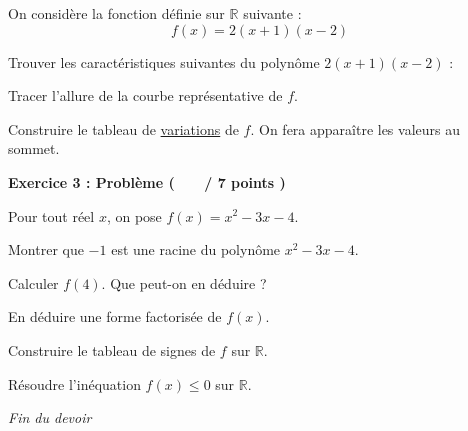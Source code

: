 \documentclass[12pt,a4paper]{exam}
\begin{document}
\vspace{5pt}
\noindent
On considère la fonction définie sur $\mathbb{R}$ suivante :
\[
f(x) = 2(x+1)(x-2)
\]

\begin{questions}

\question Trouver les caractéristiques suivantes du polynôme 
$2(x+1)(x-2)$ :

\question[1] Tracer l'allure de la courbe représentative de $f$.


\question[2] Construire le tableau de \underline{variations} de $f$. On fera 
apparaître les valeurs au sommet.

\end{questions}

\vspace{0.5cm}

\noindent
\textbf{Exercice 3 : Problème ( \ \ \ / 7 points )}

\vspace{5pt}
\noindent
Pour tout réel $x$, on pose $f(x) = x^2 - 3x - 4$.

\begin{questions}

\question[1] Montrer que $-1$ est une racine du 
polynôme $x^2 - 3x - 4$.

\question[1] Calculer $f(4)$. Que peut-on en déduire ?

\question[2] En déduire une forme factorisée de $f(x)$.

\question[2] Construire le tableau de signes de $f$ sur $\mathbb{R}$.

\question[1] Résoudre l'inéquation $f(x) \leq 0$ sur $\mathbb{R}$.

\end{questions}

\vspace{0.5cm}

\begin{center}
    \textit{Fin du devoir}
\end{center}
\end{document}

